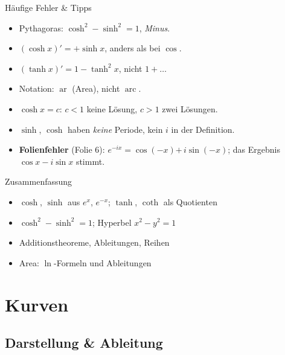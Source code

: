 \documentclass[a4paper, fontsize=7pt]{scrartcl}
\begin{document}
\begin{subbox}{Häufige Fehler \& Tipps}
\begin{itemize}
    \item Pythagoras: $\cosh^2 - \sinh^2 = 1$, \emph{Minus}.
    \item $(\cosh x)' = +\sinh x$, anders als bei $\cos$.
    \item $(\tanh x)' = 1 - \tanh^2 x$, nicht $1 + \ldots$
    \item Notation: $\operatorname{ar}$ (Area), nicht $\operatorname{arc}$.
    \item $\cosh x = c$: $c < 1$ keine Lösung, $c > 1$ zwei Lösungen.
    \item $\sinh$, $\cosh$ haben \emph{keine} Periode, kein $i$ in der Definition.
    \item \textbf{Folienfehler} (Folie 6): $e^{-ix} = \cos(-x)
          \mathbf{+}\, i\sin(-x)$; das Ergebnis $\cos x - i\sin x$ stimmt.
\end{itemize}
\end{subbox}

\begin{subbox}{Zusammenfassung}
\begin{itemize}
    \item $\cosh$, $\sinh$ aus $e^{x}$, $e^{-x}$; $\tanh$, $\coth$ als Quotienten
    \item $\cosh^2 - \sinh^2 = 1$; Hyperbel $x^2 - y^2 = 1$
    \item Additionstheoreme, Ableitungen, Reihen
    \item Area: $\ln$-Formeln und Ableitungen
\end{itemize}
\end{subbox}

\section{Kurven}

\subsection{Darstellung \& Ableitung}
\end{document}
